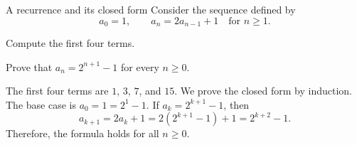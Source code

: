 \begin{problem}[10 points]{A recurrence and its closed form}
  Consider the sequence defined by
  \[
    a_0 = 1,
    \qquad
    a_n = 2a_{n-1} + 1 \quad \text{for } n \geq 1.
  \]
  \begin{subproblems}
    \item Compute the first four terms.
    \item Prove that $a_n = 2^{n+1}-1$ for every $n \geq 0$.
  \end{subproblems}

  \begin{solution}
    The first four terms are $1$, $3$, $7$, and $15$.
    We prove the closed form by induction.
    The base case is $a_0=1=2^1-1$.
    If $a_k=2^{k+1}-1$, then
    \[
      a_{k+1}=2a_k+1
      =2\left(2^{k+1}-1\right)+1
      =2^{k+2}-1.
    \]
    Therefore, the formula holds for all $n\geq 0$.
  \end{solution}
\end{problem}
